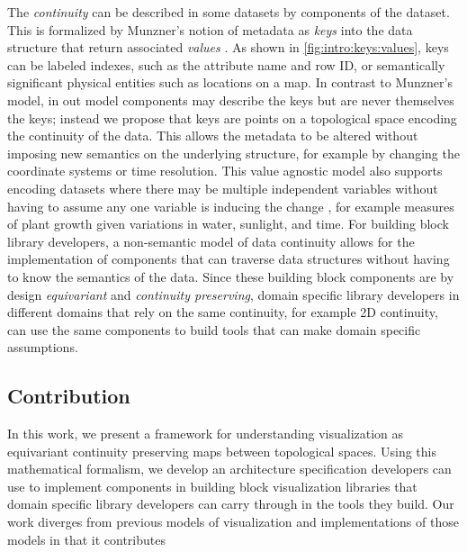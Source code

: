 \documentclass[../main.tex]{subfiles}
\begin{document}
The \textit{continuity} can be described in some datasets by components of the dataset. This is formalized by Munzner's notion of metadata as \textit{keys} into the data structure that return associated \textit{values} \cite{munznerChDataAbstraction}. As shown in \autoref{fig:intro:keys:values}, keys can be labeled indexes, such as the attribute name and row ID, or semantically significant physical entities such as locations on a map. In contrast to Munzner's model, in out model components may describe the keys but are never themselves the keys; instead we propose that keys are points on a topological space encoding the continuity of the data. This allows the metadata to be altered without imposing new semantics on the underlying structure, for example by changing the coordinate systems or time resolution. This value agnostic model also supports encoding datasets where there may be multiple independent variables without having to assume any one variable is inducing the change , for example measures of plant growth given variations in water, sunlight, and time. For building block library developers, a non-semantic model of data continuity allows for the implementation of components that can traverse data structures without having to know the semantics of the data. Since these building block components are by design \textit{equivariant} and \textit{continuity preserving}, domain specific library developers in different domains that rely on the same continuity, for example 2D continuity, can use the same components to build tools that can make domain specific assumptions.

\subsection{Contribution}
In this work, we present a framework for understanding visualization as equivariant continuity preserving maps between topological spaces. Using this mathematical formalism, we develop an architecture specification developers can use to implement components in building block visualization libraries that domain specific library developers can carry through in the tools they build. Our work diverges from previous models of visualization and implementations of those models in that it contributes
\end{document}
